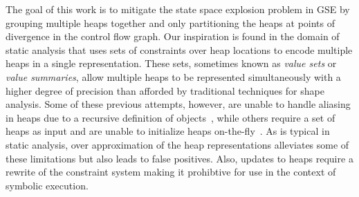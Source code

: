 
The goal of this work is to mitigate the state space explosion problem
in GSE by grouping multiple heaps together and only partitioning the
heaps at points of divergence in the control flow graph. Our
inspiration is found in the domain of static analysis that uses sets
of constraints over heap locations to encode multiple heaps in a
single representation. These sets, sometimes known as \emph{value
  sets} or \emph{value summaries}, allow multiple heaps to be
represented simultaneously with a higher degree of precision than
afforded by traditional techniques for shape analysis. Some of these
previous attempts, however, are unable to handle aliasing in heaps due
to a recursive definition of objects~\cite{Xie:2005}, while others require a
set of heaps as input and are unable to initialize heaps
on-the-fly~\cite{Dillig:2011,Tillmann:2008}.  As is typical in static analysis, over
approximation of the heap representations alleviates some of these
limitations but also leads to false positives. Also, updates to heaps
require a rewrite of the constraint system making it prohibtive for use
in the context of symbolic execution.

\begin{comment}
Unfortunately, value sets often do not support aliasing and require a
recursive definition of objects~\cite{..}. Also, heap updates often
require that the path constraint be rewritten to reflect the update,
and the constraints in the value set may also need to be rewritten with the
addition of auxiliary variables. These non-local operations make it
difficult to use value sets in symbolic execution. As is
typical in static analysis, over approximation of the value sets
alleviates some of the limitations but also leads to false positives.
\end{comment}




